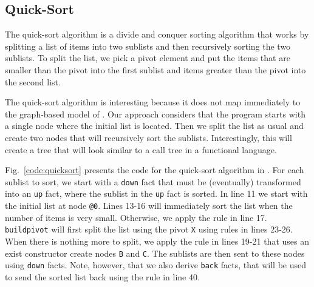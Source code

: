 \subsection{Quick-Sort}

The quick-sort algorithm is a divide and conquer sorting algorithm that works by splitting
a list of items into two sublists and then recursively sorting the two sublists.
To split the list, we pick a pivot element and put the items that are smaller than the pivot
into the first sublist and items greater than the pivot into the second list.

The quick-sort algorithm is interesting because it does not map immediately to the graph-based
model of \lang. Our approach considers that the program starts with a single node where
the initial list is located. Then we split the list as usual and create two nodes
that will recursively sort the sublists. Interestingly, this will create a tree
that will look similar to a call tree in a functional language.

Fig.~\ref{code:quicksort} presents the code for the quick-sort algorithm in \lang.
For each sublist to sort, we start with a \texttt{down} fact that must be (eventually)
transformed into an \texttt{up} fact, where the sublist in the \texttt{up} fact is sorted.
In line 11 we start with the initial list at node \texttt{@0}. Lines 13-16 will immediately
sort the list when the number of items is very small. Otherwise, we apply the rule in line 17.
\texttt{buildpivot} will first split the list using the pivot \texttt{X} using rules in
lines 23-26. When there is nothing more to split, we apply the rule in lines 19-21
that uses an exist constructor create nodes \texttt{B} and \texttt{C}. The sublists
are then sent to these nodes using \texttt{down} facts. Note, however, that we also
derive \texttt{back} facts, that will be used to send the sorted list back using the rule
in line 40.

